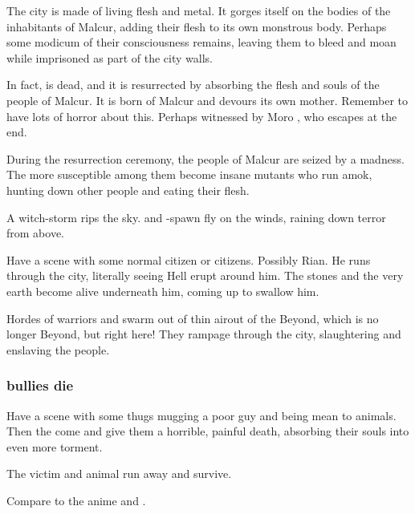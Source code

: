 \begin{garbage}
The city is made of living flesh and metal. It gorges itself on the bodies of the inhabitants of Malcur, adding their flesh to its own monstrous body. Perhaps some modicum of their consciousness remains, leaving them to bleed and moan while imprisoned as part of the city walls. 

In fact, \Nithdornazsh{} is dead, and it is resurrected by absorbing the flesh and souls of the people of Malcur. It is born of Malcur and devours its own mother. Remember to have lots of horror about this. Perhaps witnessed by Moro \Cornel, who escapes at the end. 

During the resurrection ceremony, the people of Malcur are seized by a madness. The more susceptible among them become insane mutants who run amok, hunting down other people and eating their flesh. 

A witch-storm rips the sky. \Pdaemons{} and \dragon-spawn fly on the winds, raining down terror from above. 

Have a scene with some normal \Malcuric{} citizen or citizens. Possibly Rian. He runs through the city, literally seeing Hell erupt around him. The stones and the very earth become alive underneath him, coming up to swallow him. 

Hordes of warriors and \pdaemons{} swarm out of thin air\dash out of the Beyond, which is no longer Beyond, but right here! They rampage through the city, slaughtering and enslaving the people. 






\subsubsection{\Malcuric{} bullies die}
Have a scene with some \Malcuric{} thugs mugging a poor guy and being mean to animals. Then the \daemons{} come and give them a horrible, painful death, absorbing their souls into even more torment. 

The victim and animal run away and survive. 

Compare to the anime \cite[episode 6]{Anime:TokyoMajin} and \cite{Anime:ElfenLied}. 






\end{garbage}
